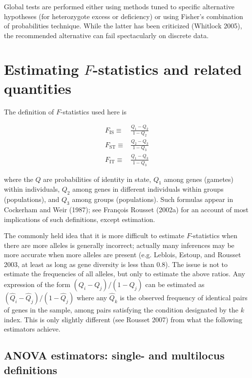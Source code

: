 \documentclass[12pt,]{book}
\theoremstyle{definition}
\theoremstyle{definition}
\theoremstyle{definition}
\theoremstyle{remark}
\begin{document}
Global tests are performed either using methods tuned to specific
alternative hypotheses (for heterozygote excess or deficiency) or using
Fisher's combination of probabilities technique. While the latter has
been criticized (Whitlock 2005), the recommended alternative can fail
spectacularly on discrete data.

\section{\texorpdfstring{Estimating \(F\)-statistics and related
quantities}{Estimating F-statistics and related quantities}}\label{estimating-f-statistics-and-related-quantities}

The definition of
\(F\)-statistics used here
is

\[\begin{aligned}
 {F_\mathrm{IS}}\equiv &\frac{Q_1-Q_2}{1-Q_2}\\
 {F_\mathrm{ST}}\equiv &\frac{Q_2-Q_3}{1-Q_3}\\
 {F_\mathrm{IT}}\equiv &\frac{Q_1-Q_3}{1-Q_3}
 \end{aligned}\]

where the \(Q\) are probabilities of identity in state, \(Q_1\) among
genes (gametes) within individuals, \(Q_2\) among genes in different
individuals within groups (populations), and \(Q_3\) among groups
(populations). Such formulas appear in Cockerham and Weir (1987); see
François Rousset (2002a) for an account of most implications of such
definitions, except estimation.

The commonly held idea that it is more difficult to estimate
\(F\)-statistics when there are more alleles is generally incorrect;
actually many inferences may be more accurate when more alleles are
present (e.g. Leblois, Estoup, and Rousset 2003, at least as long as
gene diversity is less than 0.8). The issue is not to estimate the
frequencies of all alleles, but only to estimate the above
ratios. Any
expression of the form \((Q_i-Q_j)/(1-Q_j)\) can be estimated as
\((\hat{Q}_i-\hat{Q}_j)/(1-\hat{Q}_j)\) where any \(\hat{Q}_k\) is the
observed frequency of identical pairs of genes in the sample, among
pairs satisfying the condition designated by the \(k\) index. This is
only slightly different (see Rousset 2007) from what the following
estimators achieve.

\subsection{ANOVA estimators: single- and multilocus
definitions}\label{Fmulti}
\end{document}
